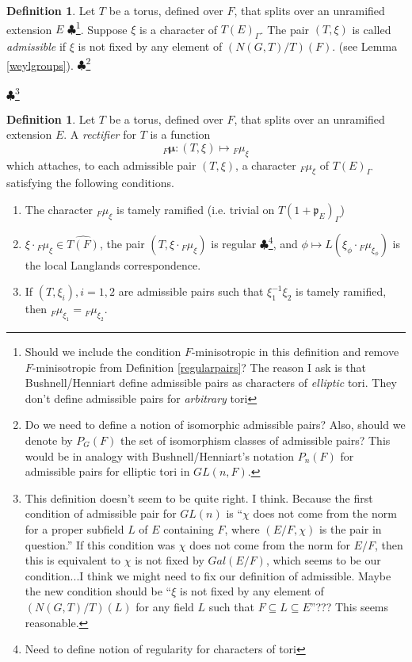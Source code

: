 \documentclass[11pt]{amsart}
\theoremstyle{plain}
\newcommand{\MAxxx}[1]{$\clubsuit$\footnote{#1}}
\theoremstyle{definition}
\newtheorem{definition}[theorem]{Definition}
\begin{document}
\begin{definition}\label{admissibledefinition}
Let $T$ be a torus, defined over $F$, that splits over an unramified
  extension $E$ \MAxxx{Should we include the condition $F$-minisotropic
  in this definition and remove $F$-minisotropic from Definition \ref{regularpairs}?
  The reason I ask is that Bushnell/Henniart define admissible pairs as characters
  of \emph{elliptic} tori.  They don't define admissible pairs for \emph{arbitrary}
  tori}.  Suppose $\xi$ is a character of $T(E)_{\Gamma}$.
The pair $(T, \xi)$ is called \emph{admissible} if $\xi$ is not fixed
by any element of $(N(G,T)/T)(F)$. (see Lemma \ref{weylgroups}). \MAxxx{Do we need
to define a notion of isomorphic admissible pairs?  Also, should we
denote by $P_G(F)$ the set of isomorphism classes of admissible pairs?  This
would be in analogy with Bushnell/Henniart's notation $P_n(F)$ for admissible
pairs for elliptic tori in $GL(n,F)$.}
\end{definition}\MAxxx{This definition doesn't seem to be quite right.  I think.
Because the first condition of admissible pair for $GL(n)$ is ``$\chi$ does not
come from the norm for a proper subfield $L$ of $E$ containing $F$, where
$(E/F, \chi)$ is the pair in question.'' If this condition was $\chi$ does not
come from the norm for $E/F$, then this is equivalent to $\chi$ is not fixed by
$Gal(E/F)$, which seems to be our condition...I think we might need to fix our
definition of admissible. Maybe the new condition should be ``$\xi$ is not
fixed by any element of $(N(G,T)/T)(L)$ for any field $L$ such that
$F \subseteq L \subseteq E$''???  This seems reasonable.}

\begin{definition}\label{rectifierdefinition}
  Let $T$ be a torus, defined over $F$, that splits over an unramified
  extension $E$.  A \emph{rectifier} for $T$ is a function $${}_F
  \boldsymbol\mu : (T, \xi) \mapsto {}_F \mu_{\xi}$$ which attaches,
  to each admissible pair $(T, \xi)$, a character ${}_F
  \mu_{\xi}$ of $T(E)_{\Gamma}$ satisfying the following conditions.

\begin{enumerate}
\item The character ${}_F \mu_{\xi}$ is tamely ramified (i.e. trivial on
  $T(1 + \mathfrak{p}_E)_{\Gamma}$)

\item $\xi \cdot {}_F \mu_{\xi} \in \widehat{T(F)}$, the pair $(T, \xi \cdot {}_F \mu_{\xi})$
 is regular \MAxxx{Need to define notion of regularity for characters
    of tori}, and $\phi \mapsto L(\xi_{\phi} \cdot {}_F \mu_{\xi_{\phi}})$
  is the local Langlands correspondence.

\item If $(T, \xi_i), i = 1,2$ are admissible pairs  such that
$\xi_1^{-1} \xi_2$ is tamely ramified, then
${}_F \mu_{\xi_1} = {}_F \mu_{\xi_2}$.
\end{enumerate}

\end{definition}
\end{document}
